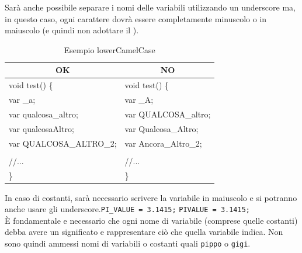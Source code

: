 Sarà anche possibile separare i nomi delle variabili utilizzando un underscore ma, in questo caso, ogni carattere dovrà essere completamente minuscolo o in maiuscolo (e quindi non adottare il ).\\
\begin{table} [H]
	\begin{center}
		\begin{tabular}{ | l | l |}
			\multicolumn{1}{c}{\textbf{OK}}&\multicolumn{1}{c}{\textbf{NO}}\\ 
			\hline
			void test() \{
			&void test() \{\\
			\hspace{0.5cm}var \_a;
			&\hspace{0.5cm}var \_A;\\
			\hspace{0.5cm}var qualcosa\_altro;
			&\hspace{0.5cm}var QUALCOSA\_altro;\\
			\hspace{0.5cm}var qualcosaAltro;
			&\hspace{0.5cm}var Qualcosa\_Altro;\\
			\hspace{0.5cm}var QUALCOSA\_ALTRO\_2;
			&\hspace{0.5cm}var Ancora\_Altro\_2;\\
			&\\
			\hspace{0.5cm}//...									&
			\hspace{0.5cm}//... \\
			\}&\}\\
			\hline
		\end{tabular}
	\end{center}
	\caption{Esempio lowerCamelCase}
\end{table}
	
In caso di costanti, sarà necessario scrivere la variabile in maiuscolo e si potranno anche usare gli underscore.\hspace{1cm}\texttt{PI\_VALUE  = 3.1415;} \hspace{0.5cm} \texttt{PIVALUE = 3.1415;}\\[0.5cm]
È fondamentale e necessario che ogni nome di variabile (comprese quelle costanti) debba avere un significato e rappresentare ciò che quella variabile indica. Non sono quindi ammessi nomi di variabili o costanti quali \texttt{pippo} o \texttt{gigi}.

